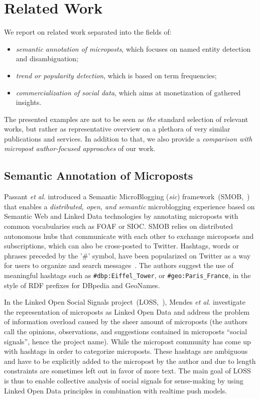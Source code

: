 \documentclass{iosart2c}
\begin{document}
\section{Related Work} \label{sec:relatedwork}
We report on related work separated into the fields of:
\begin{itemize}
\item \emph{semantic annotation of microposts}, which focuses on named entity detection and disambiguation;
\item \emph{trend or popularity detection}, which is based on term frequencies;
\item \emph{commercialization of social data}, which aims at monetization of gathered insights.
\end{itemize}
The presented examples are not to be seen as \emph{the} standard selection of relevant works, but rather as representative overview on a plethora of very similar publications and services.
In addition to that, we also provide a \emph{comparison with micropost author-focused approaches} of our work.

\subsection{Semantic Annotation of Microposts}
Passant \textit{et al.} introduced a Semantic MicroBlogging (\textit{sic}) framework~(SMOB,~\cite{Passant2008}) that enables a \textit{distributed, open, and semantic} microblogging experience based on Semantic Web and Linked Data technologies by annotating microposts with common vocabularies such as FOAF or SIOC.
SMOB relies on distributed autonomous hubs that communicate with each other to exchange microposts and subscriptions, which can also be cross-posted to Twitter.
Hashtags, words or phrases preceded by the '\#' symbol, have been popularized on Twitter as a way for users to organize and search messages~\cite{hashtag}.
The authors suggest the use of meaningful hashtags such as \texttt{\#dbp:Eiffel\_Tower}, or \texttt{\#geo:Paris\_France}, in the style of RDF prefixes for DBpedia and GeoNames.

In the Linked Open Social Signals project~(LOSS,~\cite{Mendes:LOSS}), Mendes \textit{et al.} investigate the representation of microposts as Linked Open Data and address the problem of information overload caused by the sheer amount of microposts (the authors call the opinions, observations, and suggestions contained in microposts ``social signals'', hence the project name).
While the micropost community has come up with hashtags in order to categorize microposts.
These hashtags are ambiguous and have to be explicitly added to the micropost by the author and due to length constraints are sometimes left out in favor of more text.
The main goal of LOSS is thus to enable collective analysis of social signals for sense-making by using Linked Open Data principles in combination with realtime push models.
\end{document}
